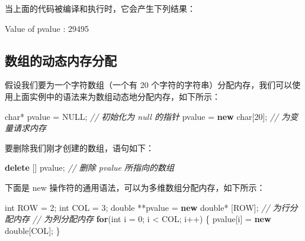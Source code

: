 \documentclass[
]{article}
\newenvironment{Shaded}{}{}
\newcommand{\CommentTok}[1]{\textcolor[rgb]{0.38,0.63,0.69}{\textit{#1}}}
\newcommand{\ControlFlowTok}[1]{\textcolor[rgb]{0.00,0.44,0.13}{\textbf{#1}}}
\newcommand{\DataTypeTok}[1]{\textcolor[rgb]{0.56,0.13,0.00}{#1}}
\newcommand{\DecValTok}[1]{\textcolor[rgb]{0.25,0.63,0.44}{#1}}
\newcommand{\KeywordTok}[1]{\textcolor[rgb]{0.00,0.44,0.13}{\textbf{#1}}}
\newcommand{\NormalTok}[1]{#1}
\newcommand{\OperatorTok}[1]{\textcolor[rgb]{0.40,0.40,0.40}{#1}}
\begin{document}
当上面的代码被编译和执行时，它会产生下列结果：

\begin{Shaded}
\begin{Highlighting}[]
\NormalTok{Value of pvalue }\OperatorTok{:} \DecValTok{29495}
\end{Highlighting}
\end{Shaded}

\hypertarget{ux6570ux7ec4ux7684ux52a8ux6001ux5185ux5b58ux5206ux914d}{%
\subsection{数组的动态内存分配}\label{ux6570ux7ec4ux7684ux52a8ux6001ux5185ux5b58ux5206ux914d}}

假设我们要为一个字符数组（一个有 20
个字符的字符串）分配内存，我们可以使用上面实例中的语法来为数组动态地分配内存，如下所示：

\begin{Shaded}
\begin{Highlighting}[]
\DataTypeTok{char}\OperatorTok{*}\NormalTok{ pvalue  }\OperatorTok{=}\NormalTok{ NULL}\OperatorTok{;}   \CommentTok{// 初始化为 null 的指针}
\NormalTok{pvalue  }\OperatorTok{=} \KeywordTok{new} \DataTypeTok{char}\OperatorTok{[}\DecValTok{20}\OperatorTok{];} \CommentTok{// 为变量请求内存}
\end{Highlighting}
\end{Shaded}

要删除我们刚才创建的数组，语句如下：

\begin{Shaded}
\begin{Highlighting}[]
\KeywordTok{delete} \OperatorTok{[]}\NormalTok{ pvalue}\OperatorTok{;}        \CommentTok{// 删除 pvalue 所指向的数组}
\end{Highlighting}
\end{Shaded}

下面是 new 操作符的通用语法，可以为多维数组分配内存，如下所示：

\begin{Shaded}
\begin{Highlighting}[]
\DataTypeTok{int}\NormalTok{ ROW }\OperatorTok{=} \DecValTok{2}\OperatorTok{;}
\DataTypeTok{int}\NormalTok{ COL }\OperatorTok{=} \DecValTok{3}\OperatorTok{;}
\DataTypeTok{double} \OperatorTok{**}\NormalTok{pvalue  }\OperatorTok{=} \KeywordTok{new} \DataTypeTok{double}\OperatorTok{*} \OperatorTok{[}\NormalTok{ROW}\OperatorTok{];} \CommentTok{// 为行分配内存}
\CommentTok{// 为列分配内存}
\ControlFlowTok{for}\OperatorTok{(}\DataTypeTok{int}\NormalTok{ i }\OperatorTok{=} \DecValTok{0}\OperatorTok{;}\NormalTok{ i }\OperatorTok{\textless{}}\NormalTok{ COL}\OperatorTok{;}\NormalTok{ i}\OperatorTok{++)} \OperatorTok{\{}
\NormalTok{    pvalue}\OperatorTok{[}\NormalTok{i}\OperatorTok{]} \OperatorTok{=} \KeywordTok{new} \DataTypeTok{double}\OperatorTok{[}\NormalTok{COL}\OperatorTok{];}
\OperatorTok{\}}
\end{Highlighting}
\end{Shaded}
\end{document}
